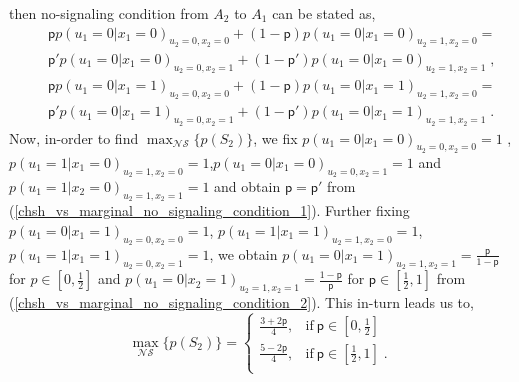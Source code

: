 \begin{widetext}
\begin{appendices}
then no-signaling condition
from $A_2$ to $A_1$ can be stated as,
\begin{eqnarray}
\label{chsh_vs_marginal_no_signaling_condition_1}
&&\mathsf{p}p(u_1=0|x_1=0)_{u_2=0,x_2=0}+(1-\mathsf{p})p(u_1=0|x_1=0)_{u_2=1,x_2=0}={}\nonumber\\&&
\mathsf{p}'p(u_1=0|x_1=0)_{u_2=0,x_2=1}+(1-\mathsf{p}')p(u_1=0|x_1=0)_{u_2=1,x_2=1} \; ,
\end{eqnarray}
\begin{eqnarray}
\label{chsh_vs_marginal_no_signaling_condition_2}
&&\mathsf{p}p(u_1=0|x_1=1)_{u_2=0,x_2=0}+(1-\mathsf{p})p(u_1=0|x_1=1)_{u_2=1,x_2=0}={}\nonumber\\&&
\mathsf{p}'p(u_1=0|x_1=1)_{u_2=0,x_2=1}+(1-\mathsf{p}')p(u_1=0|x_1=1)_{u_2=1,x_2=1} \; .
\end{eqnarray}
Now, in-order to find $\max_{\mathcal{NS}} \{p({S_2})\}$, we fix
$p(u_1=0|x_1=0)_{u_2=0,x_2=0}=1$ ,$p(u_1=1|x_1=0)_{u_2=1,x_2=0}=1$,$p(u_1=0|x_1=0)_{u_2=0,x_2=1}=1$ and $p(u_1=1|x_2=0)_{u_2=1,x_2=1}=1$ and obtain $\mathsf{p}=\mathsf{p}{'}$ from (\ref{chsh_vs_marginal_no_signaling_condition_1}). Further fixing $p(u_1=0|x_1=1)_{u_2=0,x_2=0}=1$,  $p(u_1=1|x_1=1)_{u_2=1,x_2=0}=1$,  $p(u_1=1|x_1=1)_{u_2=0,x_2=1}=1$, we obtain $p(u_1=0|x_1=1)_{u_2=1,x_2=1}=\frac{\mathsf{p}}{1-\mathsf{p}}$ for $p\in [0,\frac{1}{2}] $ and  $p(u_1=0|x_2=1)_{u_2=1,x_2=1}=\frac{1-\mathsf{p}}{\mathsf{p}}$ for $\mathsf{p}\in [\frac{1}{2},1] $ from  (\ref{chsh_vs_marginal_no_signaling_condition_2}). This in-turn leads us to, 
\begin{equation}
\label{chsh_marginal_result}
    \max_{\mathcal{NS}} \{ p({S_2})\} =
    \begin{cases}
      \frac{3+2\mathsf{p}}{4}, & \text{if}\ \mathsf{p}\in[0,\frac{1}{2}]\\
      \frac{5-2\mathsf{p}}{4}, & \text{if}\ \mathsf{p}\in[\frac{1}{2},1] \; .\\
     \end{cases} 
\end{equation}


\end{appendices}
\end{widetext}

